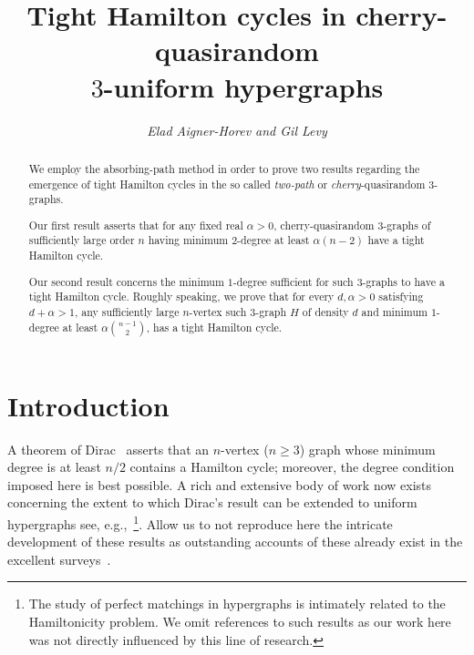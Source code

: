 \documentclass[11pt,reqno]{amsart}
\begin{document}
\title{\lsstyle Tight Hamilton cycles in cherry-quasirandom\\ $3$-uniform hypergraphs}
\author{{\em Elad Aigner-Horev and Gil Levy}}
\date{}
\maketitle

\begin{abstract}
We employ the absorbing-path method in order to prove two results regarding the emergence of tight Hamilton cycles in the so called {\em two-path} or {\em cherry}-quasirandom $3$-graphs.

Our first result asserts that for any fixed real $\alpha >0$, cherry-quasirandom $3$-graphs of sufficiently large order $n$ having  minimum $2$-degree at least $\alpha (n-2)$ have a tight Hamilton cycle. 

Our second result concerns the minimum $1$-degree sufficient for such $3$-graphs to have a tight Hamilton cycle. Roughly speaking, we prove that for every $d,\alpha >0$ satisfying $d + \alpha >1$, any sufficiently large $n$-vertex such $3$-graph $H$ of density $d$ and minimum $1$-degree at least $\alpha \binom{n-1}{2}$, has a tight Hamilton cycle.  
\end{abstract}

\begin{addmargin}[6em]{6em}
{\small
\renewcommand{\contentsname}{}
\tableofcontents
}
\end{addmargin}

\newpage

\section{Introduction}

A theorem of Dirac~\cite{Dirac} asserts that an $n$-vertex ($n\geq 3$)  graph whose minimum degree is at least $n/2$ contains a Hamilton cycle; moreover, the degree condition imposed here is best possible. A rich and extensive body of work now exists concerning the extent to which Dirac's result can be extended to uniform hypergraphs see, e.g.,~\cite{Mathias1, approx,sharp,GPW12,Mathias2,JY2,JY1,Refute,Katona,Kuhn1,Kuhn2,Kuhn3,RR14,Mathias3,RRS06,RRS08,RRS11}\footnote{The study of perfect matchings in hypergraphs is intimately related to the Hamiltonicity problem. We omit references to such results as our work here was not directly influenced by this line of research.}. Allow us  to not reproduce here the intricate development of these results as outstanding accounts of these already exist in the excellent surveys~\cite{Khun5,RR10,Zhao}.
\end{document}

